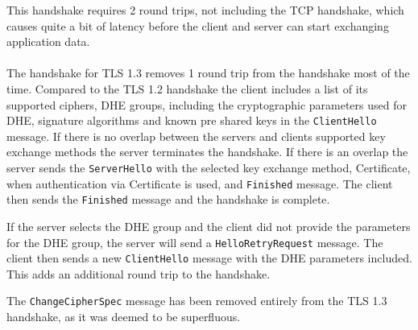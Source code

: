 This handshake requires 2 round trips, not including the TCP handshake, which causes quite a bit of latency before the client and server can start exchanging application data.
\\\\
The handshake for TLS 1.3 removes 1 round trip from the handshake most of the time. Compared to the TLS 1.2 handshake the client includes a list of its supported ciphers, DHE groups, including the cryptographic parameters used for DHE, signature algorithms and known pre shared keys in the \texttt{ClientHello} message. If there is no overlap between the servers and clients supported key exchange methods the server terminates the handshake. If there is an overlap the server sends the \texttt{ServerHello} with the selected key exchange method, Certificate, when authentication via Certificate is used, and \texttt{Finished} message.
The client then sends the \texttt{Finished} message and the handshake is complete.

If the server selects the DHE group and the client did not provide the parameters for the DHE group, the server will send a \texttt{HelloRetryRequest} message. The client then sends a new \texttt{ClientHello} message with the DHE parameters included. This adds an additional round trip to the handshake.

The \texttt{ChangeCipherSpec} message has been removed entirely from the TLS 1.3 handshake, as it was deemed to be superfluous.

